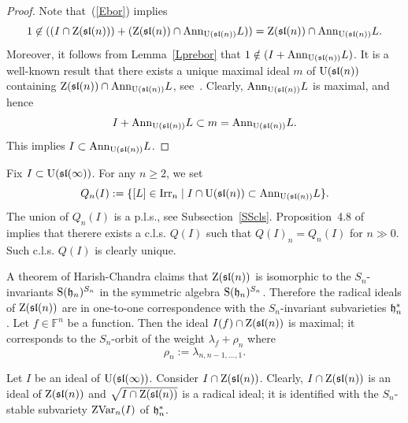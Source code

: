 \documentclass[10pt]{amsart}\oddsidemargin -1mm \evensidemargin -1mm \topmargin -15mm\headheight5mm \headsep 3.5mm \textheight 245mm\textwidth 170mm
\theoremstyle{definition}\newtheorem{theorem}{Theorem}[section]\newtheorem{lemma}[theorem]{Lemma}\newtheorem{remark}[theorem]{Remark}\newtheorem{proposition}[theorem]{Proposition}\newtheorem{corollary}[theorem]{Corollary}\newtheorem{definition}[theorem]{Definition}\newtheorem{Ex}[theorem]{Example}\newtheorem{obs}[theorem]{Observation}\newtheorem{nota}[theorem]{Notation}
\begin{document}
\begin{proof}Note that~(\ref{Ebor}) implies $$1\not\in ((I\cap {\rm Z}(\frak{sl}(n)))+({\rm Z}(\frak{sl}(n))\cap{\rm Ann}_{{\rm U}(\frak{sl}(n))}L))={\rm Z}(\frak{sl}(n))\cap{\rm Ann}_{{\rm U}(\frak{sl}(n))}L.$$ 
Moreover, it follows from Lemma~\ref{Lprebor} that $1\notin(I+{\rm Ann}_{{\rm U}(\frak{sl}(n))} L)$.
It is a well-known result that there exists a unique maximal ideal $m$ of ${\rm U}(\frak{sl}(n))$ containing ${\rm Z}(\frak{sl}(n))\cap {\rm Ann}_{{\rm U}(\frak{sl}(n))}L$, see~\cite[Subsection~1.1]{BJ}. 
Clearly, ${\rm Ann}_{{\rm U}(\frak{sl}(n))}L$ is maximal, and hence $$I+{\rm Ann}_{{\rm U}(\frak{sl}(n))}L\subset m={\rm Ann}_{{\rm U}(\frak{sl}(n))}L.$$ 
This implies $I\subset {\rm Ann}_{{\rm U}(\frak{sl}(n))}L$.\end{proof}
Fix $I\subset {\rm U}(\frak{sl}(\infty))$. 
For any $n\ge2$, we set
$$Q_n(I):=\{[L]\in {\rm Irr}_n\mid I\cap {\rm U}(\frak{sl}(n))\subset {\rm Ann}_{{\rm U}(\frak{sl}(n))}L\}.$$
The union of $Q_n(I)$ is a p.l.s., see Subsection~\ref{SScls}. %
Proposition~4.8 of~\cite{PP5} implies that therere exists a c.l.s. $Q(I)$ such that $Q(I)_n=Q_n(I)$ for $n\gg0$. 
Such c.l.s. $Q(I)$ is clearly unique.

A theorem of Harish-Chandra claims that ${\rm Z}(\frak{sl}(n))$ is isomorphic to the ${ S}_n$-invariants ${\rm S}(\frak h_n)^{S_n}$ in the symmetric algebra ${\rm S}(\frak h_n)^{S_n}$.  
Therefore the radical ideals of ${\rm Z}(\frak{sl}(n))$ are in one-to-one correspondence with the ${ S}_n$-invariant subvarieties $\frak h_n^*$. %
Let $f\in\mathbb F^n$ be a function. 
Then the ideal $I(f)\cap {\rm Z}(\frak{sl}(n))$ is maximal; it corresponds to the $S_n$-orbit of the weight $\lambda_f+\rho_n$ where
$$\rho_n:=\lambda_{n, n-1,..., 1}.$$

Let $I$ be an ideal of ${\rm U}(\frak{sl}(\infty))$. 
Consider $I\cap {\rm Z}(\frak{sl}(n))$. Clearly, $I\cap {\rm Z}(\frak{sl}(n))$ is an ideal of ${\rm Z}(\frak{sl}(n))$ and $\sqrt{I\cap {\rm Z}(\frak{sl}(n))}$ is a radical ideal; 
it is identified with the $S_n$-stable subvariety ${\rm ZVar}_n(I)$ of $\frak h_n^*$.
\end{document}

